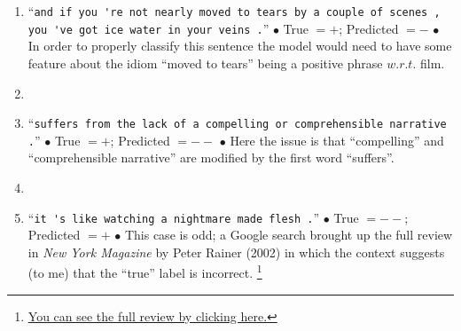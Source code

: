 \documentclass[fleqn]{MJD}
\newcommand{\0}{\emptyset}
\begin{document}
\begin{enumerate}
	\item ``\verb|and if you 're not nearly moved to tears by a couple of scenes ,| \newline \verb|you 've got ice water in your veins .|''
	\subitem $\bullet$ True $= +$; Predicted $= -$
	\subitem $\bullet$ In order to properly classify this sentence the model would need to have some feature about the idiom ``moved to tears'' being a positive phrase $w.r.t.$ film.
	\item[] 
	\item ``\verb|suffers from the lack of a compelling or comprehensible narrative .|''
	\subitem $\bullet$ True $= +$; Predicted $= --$
	\subitem $\bullet$ Here the issue is that ``compelling'' and ``comprehensible narrative'' are modified by the first word ``suffers''.
	\item[]
	\item ``\verb|it 's like watching a nightmare made flesh .|''
	\subitem $\bullet$ True $= --$; Predicted $= +$
	\subitem $\bullet$ This case is odd; a Google search brought up the full review in \textit{New York Magazine} by Peter Rainer (2002) in which the context suggests (to me) that the ``true'' label is incorrect. \footnote{\href{http://nymag.com/movies/articles/02/10/bloodysunday.htm}{You can see the full review by clicking here.}}
\end{enumerate}
\end{document}
